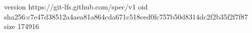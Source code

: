 version https://git-lfs.github.com/spec/v1
oid sha256:c7e47d38512a4aea81a864cda671c518ced0fc757b50d8314dc2f2b35f2f7f87
size 174916
